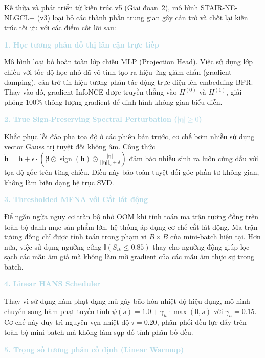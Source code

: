 Kế thừa và phát triển từ kiến trúc v5 (Giai đoạn~2), mô hình STAIR-NE-NLGCL+ (v3) loại bỏ các thành phần trung gian gây cản trở và chốt lại kiến trúc tối ưu với các điểm cốt lõi sau:

\medskip
\noindent\textcolor{lightblue}{\textbf{1. Học tương phản đồ thị lân cận trực tiếp}}

Mô hình loại bỏ hoàn toàn lớp chiếu MLP (Projection Head). Việc sử dụng lớp chiếu với tốc độ học nhỏ đã vô tình tạo ra hiệu ứng giảm chấn (gradient damping), cản trở tín hiệu tương phản tác động trực diện lên embedding BPR. Thay vào đó, gradient InfoNCE được truyền thẳng vào $H^{(0)}$ và $H^{(1)}$, giải phóng 100\% thông lượng gradient để định hình không gian biểu diễn.

\medskip
\noindent\textcolor{lightblue}{\textbf{2. True Sign-Preserving Spectral Perturbation ($\vert\boldsymbol{\eta}\vert \ge 0$)}}

Khắc phục lỗi đảo pha tọa độ ở các phiên bản trước, cơ chế bơm nhiễu sử dụng vector Gauss trị tuyệt đối không âm. Công thức $\tilde{\mathbf{h}} = \mathbf{h} + \epsilon \cdot \left( \boldsymbol{\beta} \odot \operatorname{sign}(\mathbf{h}) \odot \frac{\vert\boldsymbol{\eta}\vert}{\Vert\vert\boldsymbol{\eta}\vert\Vert_2 + \delta} \right)$ đảm bảo nhiễu sinh ra luôn cùng dấu với tọa độ gốc trên từng chiều. Điều này bảo toàn tuyệt đối góc phần tư không gian, không làm biến dạng hệ trục SVD.

\medskip
\noindent\textcolor{lightblue}{\textbf{3. Thresholded MFNA với Cắt lát động}}

Để ngăn ngừa nguy cơ tràn bộ nhớ OOM khi tính toán ma trận tương đồng trên toàn bộ danh mục sản phẩm lớn, hệ thống áp dụng cơ chế cắt lát động. Ma trận tương đồng chỉ được tính toán trong phạm vi $B \times B$ của mini-batch hiện tại. Hơn nữa, việc sử dụng ngưỡng cứng $\mathbb{I}(S_{ik} \le 0.85)$ thay cho ngưỡng động giúp lọc sạch các mẫu âm giả mà không làm mờ gradient của các mẫu âm thực sự trong batch.

\medskip
\noindent\textcolor{lightblue}{\textbf{4. Linear HANS Scheduler}}

Thay vì sử dụng hàm phạt dạng mũ gây bão hòa nhiệt độ hiệu dụng, mô hình chuyển sang hàm phạt tuyến tính $\psi(s) = 1.0 + \gamma_h \cdot \max(0, s)$ với $\gamma_h = 0.15$. Cơ chế này duy trì nguyên vẹn nhiệt độ $\tau = 0.20$, phân phối đều lực đẩy trên toàn bộ mini-batch mà không làm sụp đổ tính phân bố đều.

\medskip
\noindent\textcolor{lightblue}{\textbf{5. Trọng số tương phản cố định (Linear Warmup)}}

